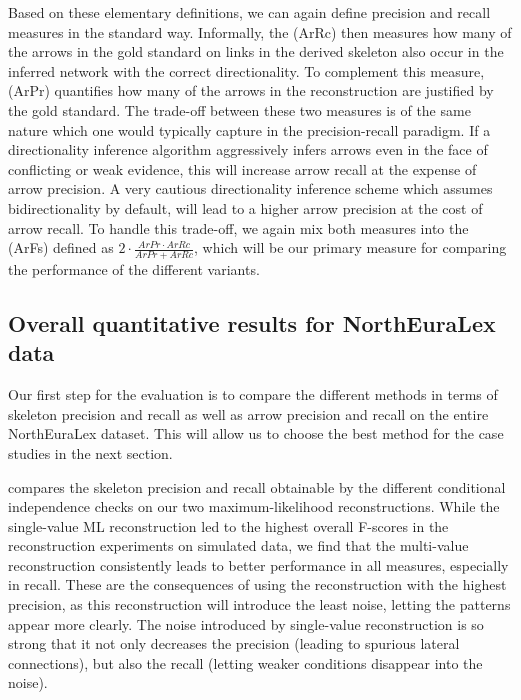 Based on these elementary definitions, we can again define precision and recall measures in the standard way. Informally, the \textit{} (ArRc) then measures how many of the arrows in the gold standard on links in the derived skeleton also occur in the inferred network with the correct directionality. To complement this measure, \textit{} (ArPr) quantifies how many of the arrows in the reconstruction are justified by the gold standard. The trade-off between these two measures is of the same nature which one would typically capture in the precision-recall paradigm. If a directionality inference algorithm aggressively infers arrows even in the face of conflicting or weak evidence, this will increase arrow recall at the expense of arrow precision. A very cautious directionality inference scheme which assumes bidirectionality by default, will lead to a higher arrow precision at the cost of arrow recall. To handle this trade-off, we again mix both measures into the \textit{} (ArFs) defined as $2 \cdot \frac{ArPr \cdot ArRc}{ArPr+ArRc}$, which will be our primary measure for comparing the performance of the different variants.

\subsection{Overall quantitative results for NorthEuraLex data}
Our first step for the evaluation is to compare the different methods in terms of skeleton precision and recall as well as arrow precision and recall on the entire NorthEuraLex dataset. This will allow us to choose the best method for the case studies in the next section.

 compares the skeleton precision and recall obtainable by the different conditional independence checks on our two maximum-likelihood reconstructions. While the single-value ML reconstruction led to the highest overall F-scores in the reconstruction experiments on simulated data, we find that the multi-value reconstruction consistently leads to better performance in all measures, especially in recall. These are the consequences of using the reconstruction with the highest precision, as this reconstruction will introduce the least noise, letting the patterns appear more clearly. The noise introduced by single-value reconstruction is so strong that it not only decreases the precision (leading to spurious lateral connections), but also the recall (letting weaker conditions disappear into the noise).

